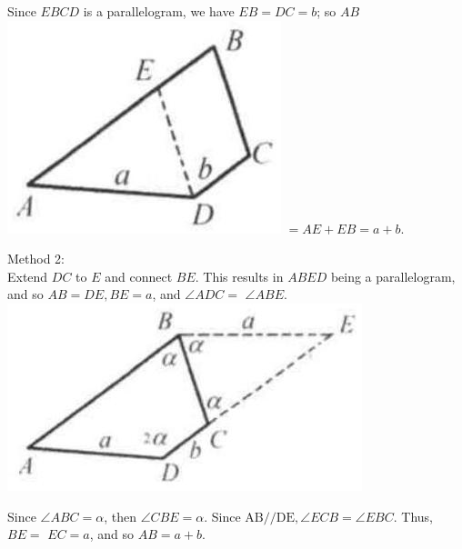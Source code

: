 \documentclass{article}
\begin{document}
Since \(E B C D\) is a parallelogram, we have \(E B=D C=b\); so \(A B\)\\
\includegraphics[width=\textwidth]{images/110(2).jpg} \(=A E+E B=a+b\).

Method 2:\\
Extend \(D C\) to \(E\) and connect \(B E\). This results in \(A B E D\) being a parallelogram, and so \(A B=D E, B E=a\), and \(\angle A D C=\) \(\angle A B E\).\\
\centering
\includegraphics[width=\textwidth]{images/110(1).jpg}


Since \(\angle A B C=\alpha\), then \(\angle C B E=\alpha\). Since \(\mathrm{AB} / / \mathrm{DE}, \angle E C B=\angle E B C\). Thus, \(B E=\) \(E C=a\), and so \(A B=a+b\).
\end{document}
